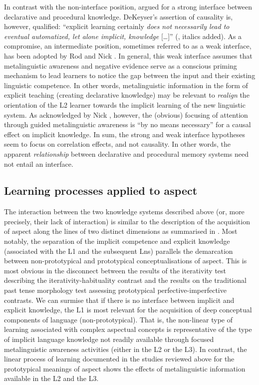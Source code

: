 \documentclass[output=paper,modfonts,nonflat,newtxmath]{langsci/langscibook}
\begin{document}
In contrast with the non-interface position, \citet{DeKeyser2003, DeKeyser2009} argued for a strong interface between declarative and procedural knowledge. DeKeyser’s assertion of causality is, however, qualified: ``explicit learning certainly \textit{does not necessarily lead to eventual automatized, let alone implicit, knowledge} […]'' (\citealt[126]{DeKeyser2009}, italics added). As a compromise, an intermediate position, sometimes referred to as a weak interface, has been adopted by Rod \citet{EllisR1993, EllisR2008} and Nick \citet{Ellis2005}. In general, this weak interface assumes that metalinguistic awareness and negative evidence serve as a conscious priming mechanism to lead learners to notice the gap between the input and their existing linguistic competence. In other words, metalinguistic information in the form of explicit teaching (creating declarative knowledge) may be relevant to \textit{realign} the orientation of the L2 learner towards the implicit learning of the new linguistic system. As acknowledged by Nick \citet[330]{Ellis2005}, however, the (obvious) focusing of attention through guided metalinguistic awareness is “by no means necessary” for a causal effect on implicit knowledge. In sum, the strong and weak interface hypotheses seem to focus on correlation effects, and not causality. In other words, the apparent \textit{relationship} between declarative and procedural memory systems need not entail an interface.

\subsection{Learning processes applied to aspect} %
\label{sec:salaberry:2.3}

The interaction between the two knowledge systems described above (or, more precisely, their lack of interaction) is similar to the description of the acquisition of aspect along the lines of two distinct dimensions as summarised in . Most notably, the separation of the implicit competence and explicit knowledge (associated with the L1 and the subsequent Lns) parallels the demarcation between non-prototypical and prototypical conceptualisations of aspect. This is most obvious in the disconnect between the results of the iterativity test describing the iterativity-habituality contrast and the results on the traditional past tense morphology test assessing prototypical perfective-imperfective contrasts. We can surmise that if there is no interface between implicit and explicit knowledge, the L1 is most relevant for the acquisition of deep conceptual components of language (non-prototypical). That is, the non-linear type of learning associated with complex aspectual concepts is representative of the type of implicit language knowledge not readily available through focused metalinguistic awareness activities (either in the L2 or the L3). In contrast, the linear process of learning documented in the studies reviewed above for the prototypical meanings of aspect shows the effects of metalinguistic information available in the L2 and the L3.
\end{document}
